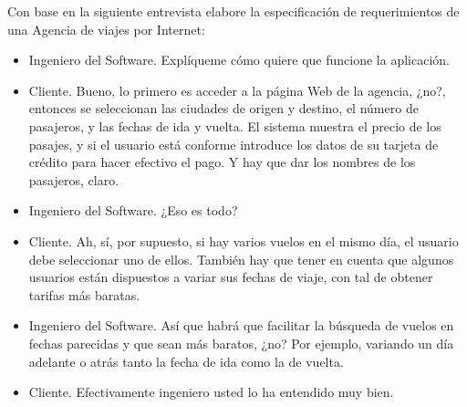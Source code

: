 Con base en la siguiente entrevista elabore la especificación de requerimientos de una Agencia de viajes por Internet:

\begin{itemize}
\item Ingeniero del Software. Explíqueme cómo quiere que funcione la aplicación.
\item Cliente. Bueno, lo primero es acceder a la página Web de la agencia, ¿no?, entonces se seleccionan las
  ciudades de origen y destino, el número de pasajeros, y las fechas de ida y vuelta. El sistema muestra el
  precio de los pasajes, y si el usuario está conforme introduce los datos de su tarjeta de crédito para hacer
  efectivo el pago. Y hay que dar los nombres de los pasajeros, claro.
\item Ingeniero del Software. ¿Eso es todo?
\item Cliente. Ah, sí, por supuesto, si hay varios vuelos en el mismo día, el usuario debe seleccionar uno de
  ellos. También hay que tener en cuenta que algunos usuarios están dispuestos a variar sus fechas de
  viaje, con tal de obtener tarifas más baratas.
\item Ingeniero del Software. Así que habrá que facilitar la búsqueda de vuelos en fechas parecidas y que sean
  más baratos, ¿no? Por ejemplo, variando un día adelante o atrás tanto la fecha de ida como la de vuelta.
\item Cliente. Efectivamente ingeniero usted lo ha entendido muy bien.
\end{itemize}
